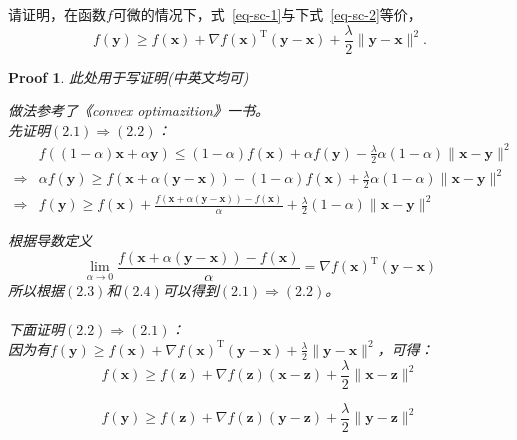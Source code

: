 \documentclass[a4paper,UTF8]{article}
\numberwithin{equation}{section}
\newtheorem*{myProof}{Proof}
\begin{document}
请证明，在函数$f$可微的情况下，式~\eqref{eq-sc-1}与下式~\eqref{eq-sc-2}等价，
\begin{equation}
  \label{eq-sc-2}
  f(\mathbf{y}) \geq f(\mathbf{x}) + \nabla f(\mathbf{x})^\mathrm{T}(\mathbf{y}-\mathbf{x}) + \frac{\lambda}{2}\lVert \mathbf{y} - \mathbf{x}\rVert^2.
\end{equation}
\begin{myProof}
此处用于写证明(中英文均可)

做法参考了《convex optimazition》一书。\\
先证明$(2.1) \Rightarrow (2.2)$：
\begin{equation}
\begin{aligned}
&f((1-\alpha)\mathbf{x} + \alpha\mathbf{y})\leq (1-\alpha)f(\mathbf{x}) + \alpha f(\mathbf{y}) - \frac{\lambda}{2}\alpha(1-\alpha)\lVert \mathbf{x} - \mathbf{y}\rVert^2\\
\Rightarrow &\alpha f(\mathbf{y}) \geq f(\mathbf{x}+\alpha(\mathbf{y}-\mathbf{x})) - (1-\alpha)f(\mathbf{x}) + \frac{\lambda}{2}\alpha(1-\alpha)\lVert \mathbf{x} - \mathbf{y}\rVert^2\\
\Rightarrow & f(\mathbf{y}) \geq f(\mathbf{x}) + \frac{f(\mathbf{x} + \alpha(\mathbf{y}-\mathbf{x}))-f(\mathbf{x})}{\alpha} + \frac{\lambda}{2}(1-\alpha)\lVert \mathbf{x} - \mathbf{y}\rVert^2
\end{aligned}
\end{equation}

根据导数定义
\begin{equation}
\lim\limits_{\alpha\rightarrow 0}\frac{f(\mathbf{x} + \alpha(\mathbf{y}-\mathbf{x}))-f(\mathbf{x})}{\alpha} = \nabla f(\mathbf{x})^\mathrm{T}(\mathbf{y}-\mathbf{x})	
\end{equation}
所以根据$(2.3)$和$(2.4)$可以得到$(2.1) \Rightarrow (2.2)$。\\\\
下面证明$(2.2) \Rightarrow (2.1)$：\\
因为有$f(\mathbf{y}) \geq f(\mathbf{x}) + \nabla f(\mathbf{x})^\mathrm{T}(\mathbf{y}-\mathbf{x}) + \frac{\lambda}{2}\lVert \mathbf{y} - \mathbf{x}\rVert^2$，可得：
\begin{equation}
f(\mathbf{x}) \geq f(\mathbf{z}) + \nabla f(\mathbf{z})(\mathbf{x}-\mathbf{z}) + \frac{\lambda}{2}\lVert \mathbf{x} - \mathbf{z}\rVert^2
\end{equation}

\begin{equation}
f(\mathbf{y}) \geq f(\mathbf{z}) + \nabla f(\mathbf{z})(\mathbf{y}-\mathbf{z}) + \frac{\lambda}{2}\lVert \mathbf{y} - \mathbf{z}\rVert^2
\end{equation}


\end{myProof}
\end{document}
